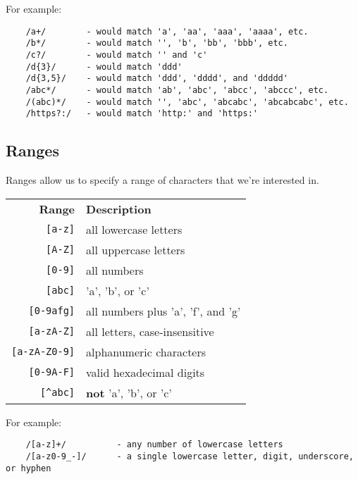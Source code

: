 For example:

\begin{verbatim}
    /a+/        - would match 'a', 'aa', 'aaa', 'aaaa', etc.
    /b*/        - would match '', 'b', 'bb', 'bbb', etc.
    /c?/        - would match '' and 'c'
    /d{3}/      - would match 'ddd'
    /d{3,5}/    - would match 'ddd', 'dddd', and 'ddddd'
    /abc*/      - would match 'ab', 'abc', 'abcc', 'abccc', etc.
    /(abc)*/    - would match '', 'abc', 'abcabc', 'abcabcabc', etc.
    /https?:/   - would match 'http:' and 'https:'
\end{verbatim}


\subsection{Ranges}

Ranges allow us to specify a range of characters that we're interested in.

\begin{center}
    \begin{small}
        \begin{tabu}{r l}
            \textbf{Range}          & \textbf{Description} \\
            \texttt{[a-z]}          & all lowercase letters \\
            \texttt{[A-Z]}          & all uppercase letters \\
            \texttt{[0-9]}          & all numbers \\
            \texttt{[abc]}          & 'a', 'b', or 'c' \\
            \texttt{[0-9afg]}       & all numbers plus 'a', 'f', and 'g' \\
            \texttt{[a-zA-Z]}       & all letters, case-insensitive \\
            \texttt{[a-zA-Z0-9]}    & alphanumeric characters \\
            \texttt{[0-9A-F]}       & valid hexadecimal digits \\
            \texttt{[\textasciicircum abc]}         & \textbf{not} 'a', 'b', or 'c'
        \end{tabu}
    \end{small}
\end{center}

For example:

\begin{verbatim}
    /[a-z]+/          - any number of lowercase letters
    /[a-z0-9_-]/      - a single lowercase letter, digit, underscore, or hyphen
\end{verbatim}

